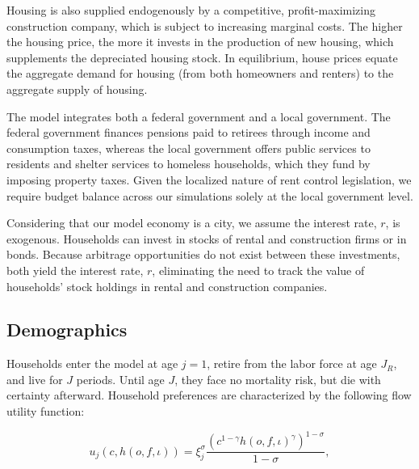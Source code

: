 \documentclass[parskip=full]{article}
\begin{document}
Housing is also supplied endogenously by a competitive, profit-maximizing construction company, which is subject to increasing marginal costs. The higher the housing price, the more it invests in the production of new housing, which supplements the depreciated housing stock. In equilibrium, house prices equate the aggregate demand for housing (from both homeowners and renters) to the aggregate supply of housing.

The model integrates both a federal government and a local government. The federal government finances pensions paid to retirees through income and consumption taxes, whereas the local government offers public services to residents and shelter services to homeless households, which they fund by imposing property taxes. Given the localized nature of rent control legislation, we require budget balance across our simulations solely at the local government level.

Considering that our model economy is a city, we assume the interest rate, $r$, is exogenous. Households can invest in stocks of rental and construction firms or in bonds. Because arbitrage opportunities do not exist between these investments, both yield the interest rate, $r$, eliminating the need to track the value of households' stock holdings in rental and construction companies.

\subsection{Demographics}\label{subsection:demographics}

Households enter the model at age $j=1$, retire from the labor force at age $J_{R}$, and live for $J$ periods. Until age $J$, they face no mortality risk, but die with certainty afterward. Household preferences are characterized by the following flow utility function:

\begin{equation*}
    u_{j}(c,h(o,f,\iota))=\xi_{j}^{\sigma}\frac{\left(c^{1-\gamma} h(o,f,\iota)^{\gamma}\right)^{1-\sigma}}{1-\sigma},
\end{equation*}
\end{document}
